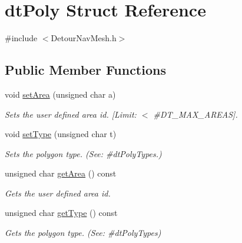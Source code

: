 \hypertarget{structdtPoly}{}\section{dt\+Poly Struct Reference}
\label{structdtPoly}


{\ttfamily \#include $<$Detour\+Nav\+Mesh.\+h$>$}

\subsection*{Public Member Functions}
\begin{DoxyCompactItemize}
\item 
\mbox{\label{structdtPoly_a84f05dcf69d70b26323b65a0c1c66954}} 
void \hyperlink{structdtPoly_a84f05dcf69d70b26323b65a0c1c66954}{set\+Area} (unsigned char a)
\begin{DoxyCompactList}\small\item\em Sets the user defined area id. \mbox{[}Limit\+: $<$ \#\+D\+T\+\_\+\+M\+A\+X\+\_\+\+A\+R\+E\+AS\mbox{]}. \end{DoxyCompactList}\item 
\mbox{\label{structdtPoly_ac625b3f1acf8df354a50464e210300dc}} 
void \hyperlink{structdtPoly_ac625b3f1acf8df354a50464e210300dc}{set\+Type} (unsigned char t)
\begin{DoxyCompactList}\small\item\em Sets the polygon type. (See\+: \#dt\+Poly\+Types.) \end{DoxyCompactList}\item 
\mbox{\label{structdtPoly_ab5e97720847977aa7a4caf8c75e73792}} 
unsigned char \hyperlink{structdtPoly_ab5e97720847977aa7a4caf8c75e73792}{get\+Area} () const
\begin{DoxyCompactList}\small\item\em Gets the user defined area id. \end{DoxyCompactList}\item 
\mbox{\label{structdtPoly_a12a7d5dcd2f1d7164531be4ecb5f35a4}} 
unsigned char \hyperlink{structdtPoly_a12a7d5dcd2f1d7164531be4ecb5f35a4}{get\+Type} () const
\begin{DoxyCompactList}\small\item\em Gets the polygon type. (See\+: \#dt\+Poly\+Types) \end{DoxyCompactList}\item 

\end{DoxyCompactItemize}
